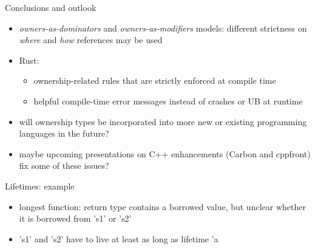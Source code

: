 \documentclass{beamer}
\begin{document}
\begin{frame}{Conclusions and outlook}
\begin{itemize}
  \item \emph{owners-as-dominators} and \emph{owners-as-modifiers} models: different strictness on \emph{where} and \emph{how} references may be used
  \item Rust: 
  \begin{itemize}
    \item ownership-related rules that are strictly enforced at compile time
    \item helpful compile-time error messages instead of crashes or UB at runtime
  \end{itemize}
  \item will ownership types be incorporated into more new or existing programming languages in the future?
  \item maybe upcoming presentations on C++ enhancements (Carbon and cppfront) fix some of these issues?
\end{itemize}
\end{frame}




\begin{frame}[fragile]{Lifetimes: example}
\begin{itemize}
  \begin{lstlisting}[language=Rust]
  fn main() {
    let s1 = String::from("short");
    let s2 = String::from("longest");
    let longest = longest(&s1, &s2);
    println!("longest string: '{}'", longest);
  }
  fn longest<'a>(s1: &'a str, s2: &'a str) -> &'a str {
    if s1.len() > s2.len() {
      s1
    } else {
      s2
    }
  }
  \end{lstlisting}
  \item longest function: return type contains a borrowed value, but unclear whether it is borrowed from 's1' or 's2'
  \item 's1' and 's2' have to live at least as long as lifetime 'a
\end{itemize}
\end{frame}
\end{document}

